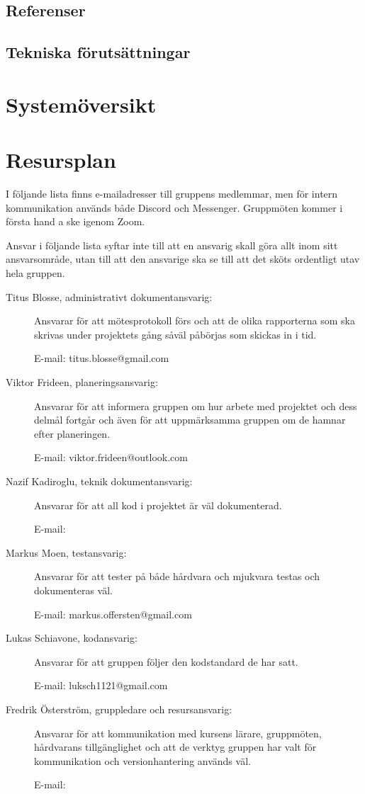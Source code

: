 \documentclass{article}
\begin{document}
\subsection{Referenser}

\subsection{Tekniska förutsättningar}

\section{Systemöversikt}

\section{Resursplan}

I följande lista finns e-mailadresser till gruppens medlemmar, men för intern kommunikation används både Discord och Messenger. Gruppmöten kommer i första hand a ske igenom Zoom.

Ansvar i följande lista syftar inte till att en ansvarig skall göra allt inom sitt ansvarsområde, utan till att den ansvarige ska se till att det sköts ordentligt utav hela gruppen.

\begin{description}
    \item[Titus Blosse, administrativt dokumentansvarig:] Ansvarar för att mötesprotokoll förs och att de olika rapporterna som ska skrivas under projektets gång såväl påbörjas som skickas in i tid.

    E-mail: titus.blosse@gmail.com

    \item[Viktor Frideen, planeringsansvarig:] Ansvarar för att informera gruppen om hur arbete med projektet och dess delmål fortgår och även för att uppmärksamma gruppen om de hamnar efter planeringen.

    E-mail: viktor.frideen@outlook.com

    \item[Nazif Kadiroglu, teknik dokumentansvarig:] Ansvarar för att all kod i projektet är väl dokumenterad.

    E-mail:

    \item[Markus Moen, testansvarig:] Ansvarar för att tester på både hårdvara och mjukvara testas och dokumenteras väl.

    E-mail: markus.offersten@gmail.com

    \item[Lukas Schiavone, kodansvarig:] Ansvarar för att gruppen följer den kodstandard de har satt.

    E-mail: luksch1121@gmail.com

    \item[Fredrik Österström, gruppledare och resursansvarig:] Ansvarar för att kommunikation med kursens lärare, gruppmöten, hårdvarans tillgänglighet och att de verktyg gruppen har valt för kommunikation och versionhantering används väl.

    E-mail:
\end{description}
\end{document}
